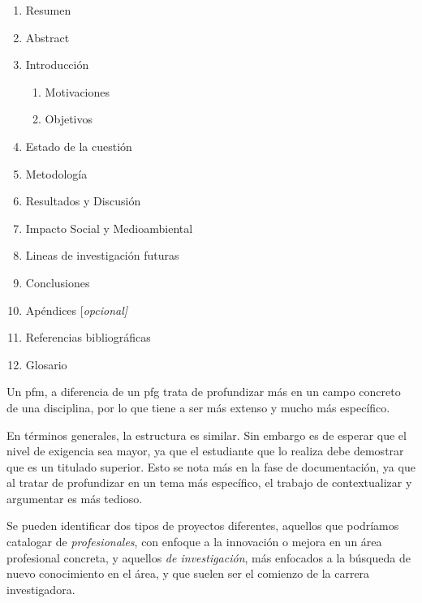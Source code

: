 \begin{enumerate}
    \item Resumen
    \item Abstract
    \item Introducción
    \begin{enumerate}
    	\item Motivaciones
    	\item Objetivos
    \end{enumerate}
    \item Estado de la cuestión
    \item Metodología
    \item Resultados y Discusión
    \item Impacto Social y Medioambiental
    \item Lineas de investigación futuras
    \item Conclusiones
    \item Apéndices [\textit{opcional]}
    \item Referencias bibliográficas
    \item Glosario
\end{enumerate}

Un \gls{pfm}, a diferencia de un \gls{pfg} trata de profundizar más en un campo concreto de una disciplina, por lo que tiene a ser más extenso y mucho más específico.

En términos generales, la estructura es similar. Sin embargo es de esperar que el nivel de exigencia sea mayor, ya que el estudiante que lo realiza debe demostrar que es un titulado superior. Esto se nota más en la fase de documentación, ya que al tratar de profundizar en un tema más específico, el trabajo de contextualizar y argumentar es más tedioso.

Se pueden identificar dos tipos de proyectos diferentes, aquellos que podríamos catalogar de \textit{profesionales}, con enfoque a la innovación o mejora en un área profesional concreta, y aquellos \textit{de investigación}, más enfocados a la búsqueda de nuevo conocimiento en el área, y que suelen ser el comienzo de la carrera investigadora.
